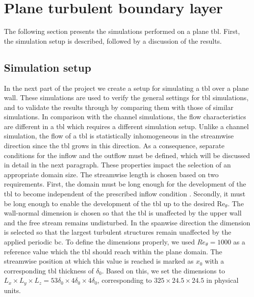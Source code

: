 \section{Plane turbulent boundary layer}\label{sec:planeTBL}

The following section presents the simulations performed on a plane \acrshort{tbl}.
First, the simulation setup is described, followed by a discussion of the results.


\subsection{Simulation setup} \label{subsec:planeTBLSetup}

In the next part of the project we create a setup for simulating a \acrshort{tbl} over a plane wall.
These simulations are used to verify the general settings for \acrshort{tbl} simulations, and to validate the results through by comparing them with those of similar simulations.
In comparison with the channel simulations, the flow characteristics are different in a \acrshort{tbl} which requires a different simulation setup.
Unlike a channel simulation, the flow of a \acrshort{tbl} is statistically inhomogeneous in the streamwise direction since the \acrshort{tbl} grows in this direction.
As a consequence, separate conditions for the inflow and the outflow must be defined, which will be discussed in detail in the next paragraph.
These properties impact the selection of an appropriate domain size.
The streamwise length is chosen based on two requirements.
First, the domain must be long enough for the development of the \acrshort{tbl} to become independent of the prescribed inflow condition \citep{schlatter_turbulent_2012}.
Secondly, it must be long enough to enable the development of the \acrshort{tbl} up to the desired $\mathrm{Re}_{\theta}$.
The wall-normal dimension is chosen so that the \acrshort{tbl} is unaffected by the upper wall and the free stream remains undisturbed.
In the spanwise direction the dimension is selected so that the largest turbulent structures remain unaffected by the applied periodic \acrlong{bc}.
To define the dimensions properly, we used $Re_{\theta} = 1000$ as a reference value which the \acrshort{tbl} should reach within the plane domain.
The streamwise position at which this value is reached is marked as $x_0$ with a corresponding \acrshort{tbl} thickness of $\delta_0$.
Based on this, we set the dimensions to $L_x \times L_y \times L_z = 53\delta_{0} \times 4\delta_{0} \times 4\delta_{0}$, corresponding to $325 \times 24.5 \times 24.5$ in physical units.

